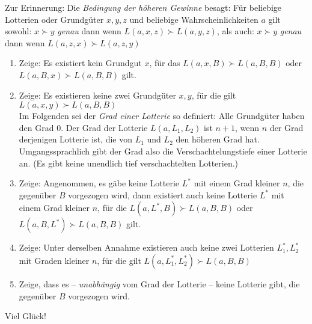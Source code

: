 \documentclass[10pt, a4paper, german]{article}
\numberwithin {equation}{section}
\begin{document}
Zur Erinnerung: Die {\em Bedingung der höheren Gewinne} besagt: Für
beliebige Lotterien oder Grundgüter $x,y,z$ und beliebige
Wahrscheinlichkeiten $a$ gilt sowohl:
$x \succ y$ {\em genau} dann wenn $L(a,x,z) \succ L(a,y,z)$,
als auch:
$x \succ y$ {\em genau} dann wenn $L(a,z,x) \succ L(a,z,y)$


\begin{enumerate}
  \item Zeige: Es existiert kein Grundgut $x$, für das $L(a,x,B) \succ L(a,B,B)$
  oder $L(a,B,x) \succ L(a,B,B)$ gilt.
  \item Zeige: Es existieren keine zwei Grundgüter $x,y$, für die gilt $L(a,x,y)
  \succ L(a,B,B)$ \\

  Im Folgenden sei der {\em Grad einer Lotterie} so definiert: Alle
  Grundgüter haben den Grad 0. Der Grad der Lotterie $L(a, L_1, L_2)$
  ist $n+1$, wenn $n$ der Grad derjenigen Lotterie ist, die von $L_1$
  und $L_2$ den höheren Grad hat. Umgangssprachlich gibt der Grad also
  die Verschachtelungstiefe einer Lotterie an. (Es gibt keine unendlich
  tief verschachtelten Lotterien.)
  
  \item Zeige: Angenommen, es gäbe keine Lotterie $L^*$ mit einem Grad kleiner
  $n$, die gegenüber $B$ vorgezogen wird, dann existiert auch keine Lotterie
  $L^*$ mit einem Grad kleiner $n$, für die $L(a,L^*,B) \succ L(a,B,B)$ oder 
  $L(a,B,L^*) \succ L(a,B,B)$ gilt.

  \item Zeige: Unter derselben Annahme existieren auch keine zwei Lotterien
  $L^*_1, L^*_2$ mit Graden kleiner $n$, für die gilt $L(a, L^*_1, L^*_2) \succ
  L(a,B,B)$

\item Zeige, dass es -- {\em unabhängig} vom Grad der Lotterie --
  keine Lotterie gibt, die gegenüber $B$ vorgezogen wird.
  
  
\end{enumerate}


\vspace{1cm}
Viel Glück!
\end{document}
